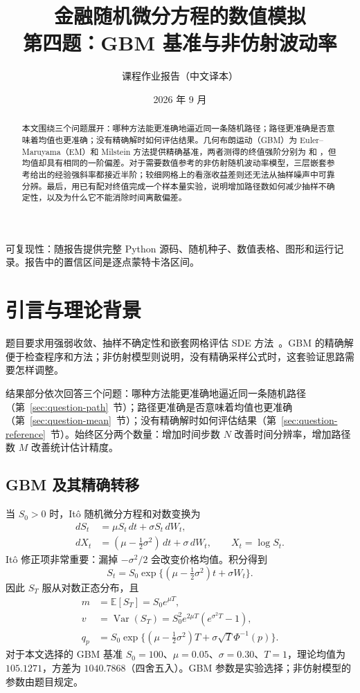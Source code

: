 \documentclass[11pt,a4paper,fontset=none]{ctexart}
\title{金融随机微分方程的数值模拟\\
\large 第四题：GBM 基准与非仿射波动率}
\author{课程作业报告（中文译本）}
\date{2026 年 9 月}
\begin{document}
\maketitle
\begin{abstract}
本文围绕三个问题展开：哪种方法能更准确地逼近同一条随机路径；路径更准确是否意味着均值也更准确；没有精确解时如何评估结果。几何布朗运动（GBM）为 Euler--Maruyama（EM）和 Milstein 方法提供精确基准，两者测得的终值强阶分别为 \GBMEMRate{} 和 \GBMMilRate{}，但均值却具有相同的一阶偏差。对于需要数值参考的非仿射随机波动率模型，三层嵌套参考给出的经验强斜率都接近半阶；较细网格上的看涨收益差则还无法从抽样噪声中可靠分辨。最后，用已有配对终值完成一个样本量实验，说明增加路径数如何减少抽样不确定性，以及为什么它不能消除时间离散偏差。
\end{abstract}
\tableofcontents
\vfill
\noindent\small 可复现性：随报告提供完整 Python 源码、随机种子、数值表格、图形和运行记录。报告中的置信区间是逐点蒙特卡洛区间。

\newpage
\section{引言与理论背景}
题目要求用强弱收敛、抽样不确定性和嵌套网格评估 SDE 方法~\cite{pack}。GBM 的精确解便于检查程序和方法；非仿射模型则说明，没有精确采样公式时，这套验证思路需要怎样调整。

结果部分依次回答三个问题：哪种方法能更准确地逼近同一条随机路径（第~\ref{sec:question-path}~节）；路径更准确是否意味着均值也更准确（第~\ref{sec:question-mean}~节）；没有精确解时如何评估结果（第~\ref{sec:question-reference}~节）。始终区分两个数量：增加时间步数 $N$ 改善时间分辨率，增加路径数 $M$ 改善统计估计精度。

\subsection{GBM 及其精确转移}
当 $S_0>0$ 时，It\^o 随机微分方程和对数变换为
\begin{align}
dS_t&=\mu S_t\,dt+\sigma S_t\,dW_t,\\
dX_t&=(\mu-\tfrac12\sigma^2)\,dt+\sigma\,dW_t,\qquad X_t=\log S_t.
\end{align}
It\^o 修正项非常重要：漏掉 $-\sigma^2/2$ 会改变价格均值。积分得到
\begin{equation}
S_t=S_0\exp\{(\mu-\tfrac12\sigma^2)t+\sigma W_t\}.
\label{eq:exact}
\end{equation}
因此 $S_T$ 服从对数正态分布，且
\begin{align}
m&=\mathbb E[S_T]=S_0e^{\mu T},\\
v&=\operatorname{Var}(S_T)=S_0^2e^{2\mu T}(e^{\sigma^2T}-1),\\
q_p&=S_0\exp\{(\mu-\tfrac12\sigma^2)T+\sigma\sqrt{T}\Phi^{-1}(p)\}.
\end{align}
对于本文选择的 GBM 基准 $S_0=100$、$\mu=0.05$、$\sigma=0.30$、$T=1$，理论均值为 $105.1271$，方差为 $1040.7868$（四舍五入）。GBM 参数是实验选择；非仿射模型的参数由题目规定。
\end{document}
